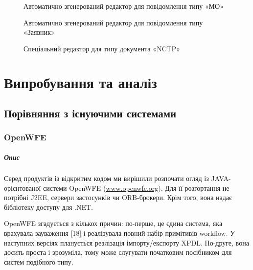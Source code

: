 \documentclass{memoir}
\begin{document}
\begin{figure}[h]
    \centering
    \caption{Автоматично згенерований редактор для повідомлення типу «МО»}
    \label{fig:mo_editor}
\end{figure}

\begin{figure}[h]
    \centering
    \caption{Автоматично згенерований редактор для повідомлення типу «Заявник»}
    \label{fig:applicant_editor}
\end{figure}

\begin{figure}[h]
    \centering
    \caption{Спеціальний редактор для типу документа «NCTP»}
    \label{fig:nctp_editor}
\end{figure}

\chapter{Випробування та аналіз}

\section{Порівняння з існуючими системами}

\subsection{OpenWFE}

\paragraph{Опис}

Серед продуктів із відкритим кодом ми вирішили розпочати огляд із JAVA-орієнтованої системи OpenWFE (\url{www.openwfe.org}). Для її розгортання не потрібні J2EE, сервери застосунків чи ORB-брокери. Крім того, вона надає бібліотеку доступу для .NET.

OpenWFE згадується з кількох причин: по-перше, це єдина система, яка врахувала зауваження [18] і реалізувала повний набір примітивів workflow. У наступних версіях планується реалізація імпорту/експорту XPDL. По-друге, вона досить проста і зрозуміла, тому може слугувати початковим посібником для систем подібного типу.
\end{document}
